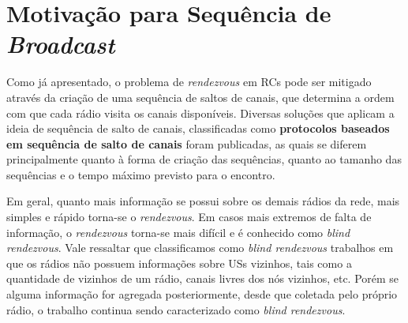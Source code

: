 
\section{Motivação para Sequência de \textit{Broadcast}}         


Como já apresentado, o problema de {\it rendezvous} em RCs pode ser mitigado através da criação de uma sequência de saltos de canais, que determina a ordem com que cada rádio visita os canais disponíveis. Diversas soluções que aplicam a ideia de sequência de salto de canais, classificadas como {\bf protocolos baseados em sequência de salto de canais} foram publicadas, as quais se diferem principalmente quanto à forma de criação das sequências, quanto ao tamanho das sequências e o tempo máximo previsto para o encontro.  


Em geral, quanto mais informação se possui sobre os demais rádios da rede, mais simples e rápido torna-se o {\it rendezvous}. Em casos mais extremos de falta de informação, o {\it rendezvous} torna-se mais difícil e é conhecido como {\it blind rendezvous}. Vale ressaltar que classificamos como {\it blind rendezvous} trabalhos em que os rádios não possuem informações sobre USs vizinhos, tais como a quantidade de vizinhos de um rádio, canais livres dos nós vizinhos, etc. Porém se alguma informação for agregada posteriormente, desde que coletada pelo próprio rádio, o trabalho continua sendo caracterizado como {\it blind rendezvous}.  

